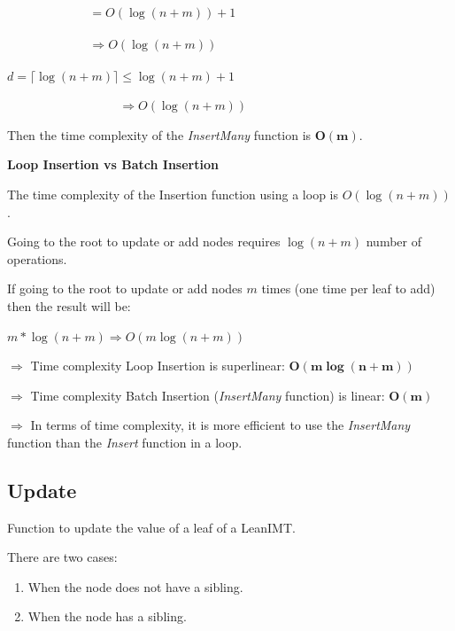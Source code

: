\documentclass{article}
\begin{document}
$\phantom{\sum_{k=0}^{d} 1 = \frac{a}{1-r}} = O(\log (n+m)) + 1$



$\phantom{\sum_{k=0}^{d} 1 = \frac{a}{1-r}} \Rightarrow O(\log (n+m))$



$d = \lceil \log (n+m) \rceil \leq \log (n+m) + 1$



$\phantom{d = \lceil \log (n + m) \rceil} \Rightarrow O(\log (n+m))$

Then the time complexity of the \textit{InsertMany} function is $\boldsymbol{O(m)}$.



\textbf{Loop Insertion vs Batch Insertion}



The time complexity of the Insertion function using a loop is $O(\log (n+m))$.



Going to the root to update or add nodes requires $ \log (n+m)$ number of operations.

If going to the root to update or add nodes $m$ times (one time per leaf to add) then the result will be:



$m * \log (n+m) \Rightarrow \boxed{O(m \log (n+m))}$



$\Rightarrow$ Time complexity Loop Insertion is superlinear: $\boldsymbol{O(m \log (n+m))}$



$\Rightarrow$ Time complexity Batch Insertion (\textit{InsertMany} function) is linear: $\boldsymbol{O(m)}$



$\Rightarrow$ In terms of time complexity, it is more efficient to use the \textit{InsertMany} function than the \textit{Insert} function in a loop.



\subsection{Update}

Function to update the value of a leaf of a LeanIMT.

There are two cases:

\begin{enumerate}
    \item When the node does not have a sibling.
    \item When the node has a sibling.
\end{enumerate}
\end{document}
